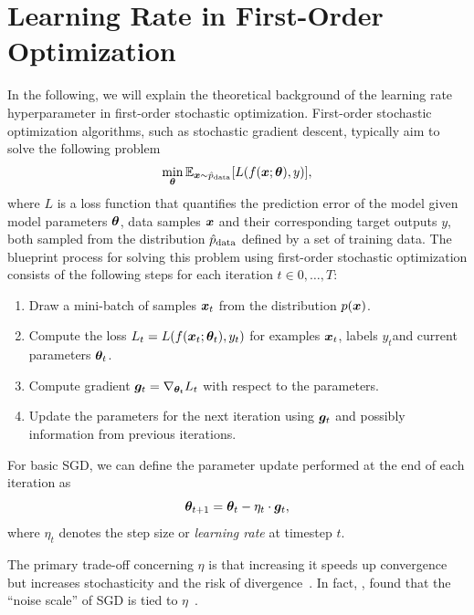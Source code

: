 \documentclass{article} %
\begin{document}
\section{Learning Rate in First-Order Optimization}

In the following, we will explain the theoretical background of the learning rate hyperparameter in first-order stochastic optimization.
First-order stochastic optimization algorithms, such as stochastic gradient descent, typically aim to solve the following problem
\begin{equation}
   \min_{{\bm{\theta}}} \mathbb{E}_{{\bm{x}} \sim \hat{p}_{\rm{data}}} [L(f({\bm{x}}; {\bm{\theta}}), y)],
\end{equation}
where $L$ is a loss function that quantifies the prediction error of the model given model parameters ${\bm{\theta}}$, data samples ${\bm{x}}$ and their corresponding target outputs $y$, both sampled from the distribution $\hat{p}_{\rm{data}}$ defined by a set of training data.
The blueprint process for solving this problem using first-order stochastic optimization consists of the following steps for each iteration $t \in 0, \ldots, T$:
\begin{enumerate}
   \item Draw a mini-batch of samples ${\bm{x}}_t$ from the distribution $p({\bm{x}})$.
   \item Compute the loss $L_t = L(f({\bm{x}}_t; {\bm{\theta}}_t), y_t)$ for examples ${\bm{x}}_t$, labels $y_t$\footnotemark[1] and current parameters ${\bm{\theta}}_t$.
   \item Compute gradient ${\bm{g}}_t = \nabla_{{\bm{\theta}}_t} L_t$ with respect to the parameters.
   \item Update the parameters for the next iteration using ${\bm{g}}_t$ and possibly information from previous iterations.
\end{enumerate}


For basic SGD, we can define the parameter update performed at the end of each iteration as
\begin{equation}\label{eq:sgd_update}
   {\bm{\theta}}_{t+1}  = {\bm{\theta}}_{t} - \eta_t \cdot {\bm{g}}_t,
\end{equation}
where $\eta_t$ denotes the step size or \textit{learning rate} at timestep $t$.

The primary trade-off concerning $\eta$ is that increasing it speeds up convergence but increases stochasticity and the risk of divergence~\citep{bengioPracticalRecommendationsGradientbased2012}.
In fact, \citet{smithBayesianPerspectiveGeneralization2018}, found that the “noise scale” of SGD is tied to $\eta$~\citep{smithBayesianPerspectiveGeneralization2018}.
\end{document}

